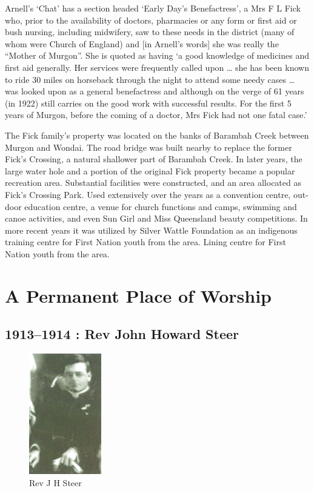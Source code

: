 Arnell's `Chat' has a section headed `Early Day's Benefactress', a Mrs F
L Fick who, prior to the availability of doctors, pharmacies or any form
or first aid or bush nursing, including midwifery, saw to these needs in
the district (many of whom were Church of England) and {[}in Arnell's
words{]} she was really the ``Mother of Murgon''. She is quoted as
having `a good knowledge of medicines and first aid generally. Her
services were frequently called upon \ldots{} she has been known to ride
30 miles on horseback through the night to attend some needy cases
\ldots{} was looked upon as a general benefactress and although on the
verge of 61 years (in 1922) still carries on the good work with
successful results. For the first 5 years of Murgon, before the coming
of a doctor, Mrs Fick had not one fatal case.'

The Fick family's property was located on the banks of Barambah Creek
between Murgon and Wondai. The road bridge was built nearby to replace
the former Fick's Crossing\emph{,} a natural shallower part of Barambah
Creek. In later years, the large water hole and a portion of the
original Fick property became a popular recreation area. Substantial
facilities were constructed, and an area allocated as Fick's Crossing
Park\emph{.} Used extensively over the years as a convention centre,
out-door education centre, a venue for church functions and camps,
swimming and canoe activities, and even Sun Girl and Miss Queensland
beauty competitions. In more recent years it was utilized by Silver
Wattle Foundation as an indigenous training centre for First Nation
youth from the area. Lining centre for First Nation youth from the area.

\printendnotes
\setcounter{endnote}{0}
\chapter{A Permanent Place of
Worship}

\section{1913--1914 : Rev John Howard
Steer}




\begin{figure}
\begin{center}
\includegraphics[width=0.28\textwidth,right]{images/JHSteer.png}
\caption{Rev J H Steer}
\end{center}
\end{figure}


